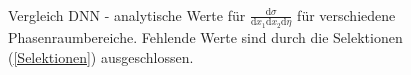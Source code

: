 \begin{figure}[tbp]
	 \\
	\caption{Vergleich DNN - analytische Werte für $\frac{\text{d} \sigma}{\text{d}x_1\text{d}x_2\text{d}\eta}$ für verschiedene Phasenraumbereiche. Fehlende Werte sind durch die Selektionen (\textsf{\autoref{Selektionen}}) ausgeschlossen.}
	\label{Schnitte Hadron}
\end{figure}


